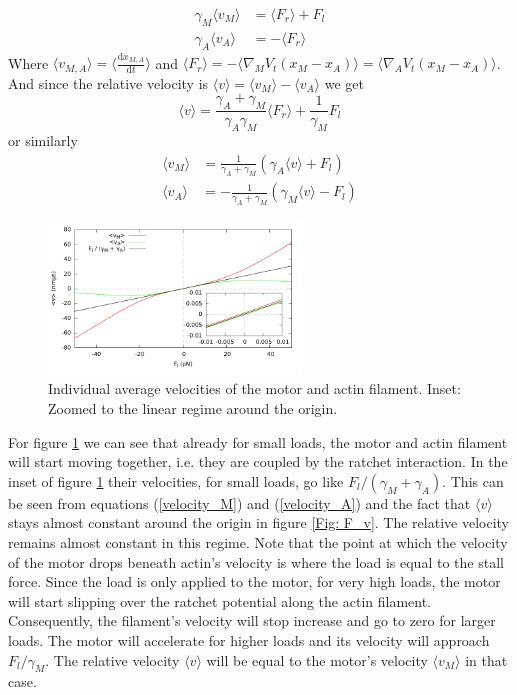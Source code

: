 \documentclass[aps,pre,onecolumn,showpacs,showkeys,a4paper]{revtex4}
\newcommand{\rmd}{{\mathrm d}}
\begin{document}
\begin{align*}
\gamma_M \langle v_M \rangle &= \langle F_r \rangle + F_l \\
\gamma_A \langle v_A \rangle &= -\langle F_r \rangle
\end{align*}
Where $\langle v_{M,A} \rangle = \langle \frac{\rmd x_{M,A}}{\rmd t} \rangle$ and $\langle F_r \rangle = - \langle \nabla_M V_t(x_M - x_A ) \rangle =\langle \nabla_A V_t(x_M - x_A ) \rangle $. 
And since the relative velocity is $\langle v \rangle = \langle v_{M} \rangle - \langle v_{A} \rangle$ we get
\begin{equation*}
\langle v \rangle = \frac{\gamma_A + \gamma_M}{\gamma_A\gamma_M} \langle F_r \rangle + \frac{1}{\gamma_M}F_l
\end{equation*}
or similarly
\begin{eqnarray*}
\langle v_M \rangle &= \frac{1}{\gamma_A + \gamma_M}\left(\gamma_A \langle v \rangle + F_l\right) \label{velocity_M}\\
\langle v_A \rangle &= -\frac{1}{\gamma_A + \gamma_M}\left(\gamma_M \langle v \rangle - F_l\right)
\label{velocity_A}
\end{eqnarray*}

\begin{figure}[h]
\centering
\includegraphics[width=0.6\textwidth,height=!]{individual_velocities}
\caption{Individual average velocities of the motor and actin filament. Inset: Zoomed to the linear regime around the origin.}
\label{Fig: ind_v} 
\end{figure}
For figure \ref{Fig: ind_v} we can see that already for small loads, the motor and actin filament will start moving together, i.e. they are coupled by the ratchet interaction. 
In the inset of figure \ref{Fig: ind_v} their velocities, for small loads, go like $F_l/(\gamma_M + \gamma_A)$. 
This can be seen from equations (\ref{velocity_M}) and (\ref{velocity_A}) and the fact that $\langle v \rangle$ stays almost constant around the origin in figure \ref{Fig: F_v}. 
The relative velocity remains almost constant in this regime.
Note that the point at which the velocity of the motor drops beneath actin's velocity is where the load is equal to the stall force.
Since the load is only applied to the motor, for very high loads, the motor will start slipping over the ratchet potential along the actin filament. 
Consequently, the filament's velocity will stop increase and go to zero for larger loads. 
The motor will accelerate for higher loads and its velocity will approach $F_l/\gamma_M$. 
The relative velocity $\langle v \rangle$ will be equal to the motor's velocity $\langle v_M \rangle$ in that case.
\end{document}
